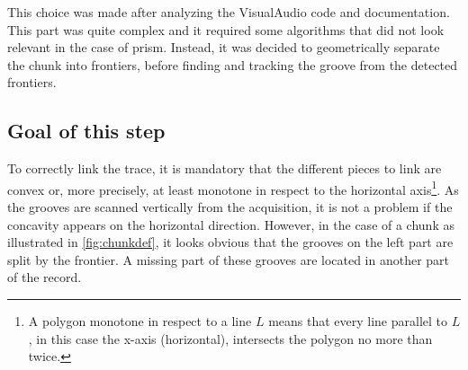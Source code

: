 This choice was made after analyzing the VisualAudio code and documentation. This part was quite complex and it required some algorithms that did not look relevant in the case of \gls{prism}. Instead, it was decided to geometrically separate the chunk into frontiers, before finding and tracking the groove from the detected frontiers.

\subsection{Goal of this step}
\label{chap:linking}

To correctly link the trace, it is mandatory that the different pieces to link are convex or, more precisely, at least monotone in respect to the horizontal axis\footnote{A polygon monotone in respect to a line $L$ means that every line parallel to $L$, in this case the x-axis (horizontal), intersects the polygon no more than twice.}. As the grooves are scanned vertically from the acquisition, it is not a problem if the concavity appears on the horizontal direction. However, in the case of a chunk as illustrated in \autoref{fig:chunkdef}, it looks obvious that the grooves on the left part are split by the frontier. A missing part of these grooves are located in another part of the record.


